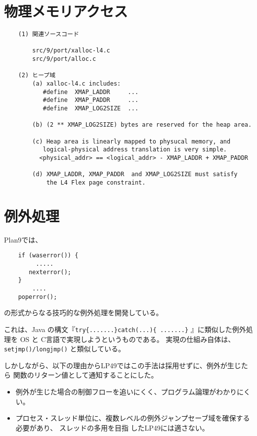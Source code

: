 {    
\chapter{ 物理メモリアクセス}

\begin{verbatim}
    (1) 関連ソースコード

        src/9/port/xalloc-l4.c
        src/9/port/alloc.c
    
    (2) ヒープ域
        (a) xalloc-l4.c includes:
           #define  XMAP_LADDR     ...
           #define  XMAP_PADDR     ...
           #define  XMAP_LOG2SIZE  ...

        (b) (2 ** XMAP_LOG2SIZE) bytes are reserved for the heap area.

        (c) Heap area is linearly mapped to physucal memory, and 
           logical-physical address translation is very simple.
          <physical_addr> == <logical_addr> - XMAP_LADDR + XMAP_PADDR

        (d) XMAP_LADDR, XMAP_PADDR  and XMAP_LOG2SIZE must satisfy 
            the L4 Flex page constraint.    
\end{verbatim}


\chapter{例外処理}

      Plan9では、
\begin{verbatim}
    if (waserror()) {
         ..... 
       nexterror();
    }   
        ....  
    poperror();
\end{verbatim}
の形式からなる技巧的な例外処理を開発している。

これは、Java の構文『\verb|try{.......}catch(...){ .......}| 』に類似した例外処理を
OS と C言語で実現しようというものである。
実現の仕組み自体は、{\tt setjmp()/longjmp()} と類似している。

しかしながら、以下の理由からLP49ではこの手法は採用せずに、例外が生じたら
関数のリターン値として通知することにした。

\begin{itemize}
\item  例外が生じた場合の制御フローを追いにくく、プログラム論理がわかりにくい。
\item  プロセス・スレッド単位に、複数レベルの例外ジャンプセーブ域を確保する必要があり、
    スレッドの多用を目指 したLP49には適さない。
\end{itemize}



}

